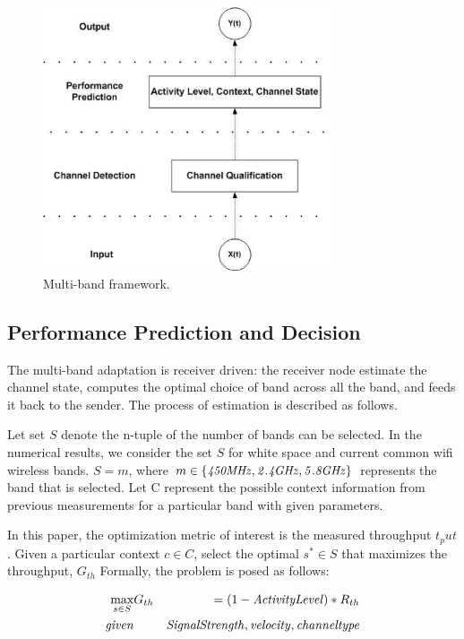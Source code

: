 \begin{figure}
\centering
\includegraphics[width=85mm]{figure/multiband_framework}
\caption{Multi-band framework.}
\label{fig:multiframe}
\end{figure}




\subsection{Performance Prediction and Decision}

The multi-band adaptation is receiver driven: the receiver node estimate the channel state, computes the optimal choice of band across all the band, and feeds it back to the sender. 
The process of estimation is described as follows.

Let set $S$ denote the n-tuple of the number of bands can be selected. In the numerical results, we consider the set $S$ for white space and current common wifi wireless bands. $S={m}$, where $m \in \{\mbox{\it 450MHz},\mbox{\it 2.4GHz},\mbox{\it 5.8GHz}\}$ represents the band that is selected. 
Let C represent the possible context information from previous measurements for a particular band with given parameters.

In this paper, the optimization metric of interest is the measured throughput $t_put$. 
Given a particular context ${c\in C}$, select the optimal $s^* \in S$ that maximizes the throughput, $G_{th}$ 
Formally, the problem is posed as follows:


\begin{eqnarray}
\max_{s \in S}& G_{th}& = (1-\mbox{\it Activity Level})*R_{th} \label{eq:throughput_optimization} \\
		\mbox{\it given} & & \mbox{\it Signal Strength}, \mbox{\it velocity}, \mbox{\it channel type} \nonumber
		\end{eqnarray}

